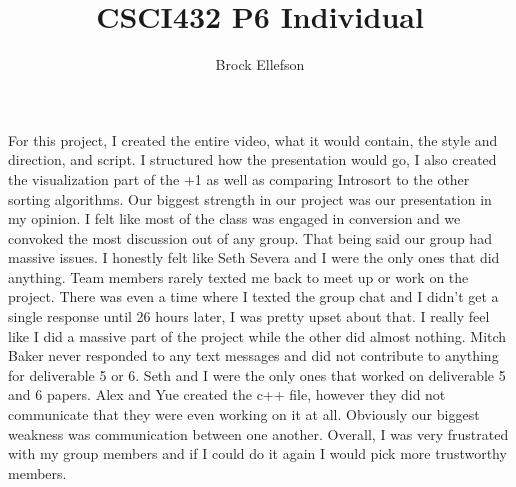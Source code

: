 \documentclass[10pt,a4paper]{article}
\author{Brock Ellefson}
\title{CSCI432 P6 Individual}
\begin{document}
\maketitle
\doublespacing
For this project, I created the entire video, what it would contain, the style and direction, and script. I structured how the presentation would go, I also created the visualization part of the +1 as well as comparing Introsort to the other sorting algorithms. Our biggest strength in our project was our presentation in my opinion. I felt like most of the class was engaged in conversion and we convoked the most discussion out of any group. That being said our group had massive issues. I honestly felt like Seth Severa and I were the only ones that did anything. Team members rarely texted me back to meet up or work on the project. There was even a time where I texted the group chat and I didn't get a single response until 26 hours later, I was pretty upset about that. I really feel like I did a massive part of the project while the other did almost nothing. Mitch Baker never responded to any text messages and did not contribute to anything for deliverable 5 or 6. Seth and I were the only ones that worked on deliverable 5 and 6 papers. Alex and Yue created the c++ file, however they did not communicate that they were even working on it at all. Obviously our biggest weakness was communication between one another. Overall, I was very frustrated with my group members and if I could do it again I would pick more trustworthy members.
\end{document}
